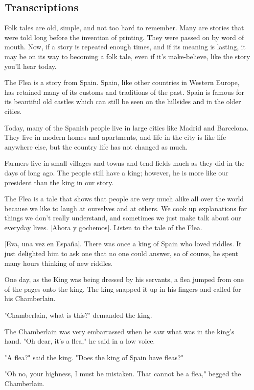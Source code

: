 \subsection{Transcriptions}

Folk tales are old, simple, and not too hard to remember. Many are stories that were told long before the invention of printing. They were passed on by word of mouth. Now, if a story is repeated enough times, and if its meaning is lasting, it may be on its way to becoming a folk tale, even if it's make-believe, like the story you'll hear today.

The Flea is a story from Spain. Spain, like other countries in Western Europe, has retained many of its customs and traditions of the past. Spain is famous for its beautiful old castles which can still be seen on the hillsides and in the older cities.

Today, many of the Spanish people live in large cities like Madrid and Barcelona. They live in modern homes and apartments, and life in the city is like life anywhere else, but the country life has not changed as much.

Farmers live in small villages and towns and tend fields much as they did in the days of long ago. The people still have a king; however, he is more like our president than the king in our story.

The Flea is a tale that shows that people are very much alike all over the world because we like to laugh at ourselves and at others. We cook up explanations for things we don't really understand, and sometimes we just make talk about our everyday lives. [Ahora y gochemos]. Listen to the tale of the Flea.

    [Eva, una vez en España]. There was once a king of Spain who loved riddles. It just delighted him to ask one that no one could answer, so of course, he spent many hours thinking of new riddles.

One day, as the King was being dressed by his servants, a flea jumped from one of the pages onto the king. The king snapped it up in his fingers and called for his Chamberlain.

"Chamberlain, what is this?" demanded the king.

The Chamberlain was very embarrassed when he saw what was in the king's hand. "Oh dear, it's a flea," he said in a low voice.

"A flea?" said the king. "Does the king of Spain have fleas?"

"Oh no, your highness, I must be mistaken. That cannot be a flea," begged the Chamberlain.

